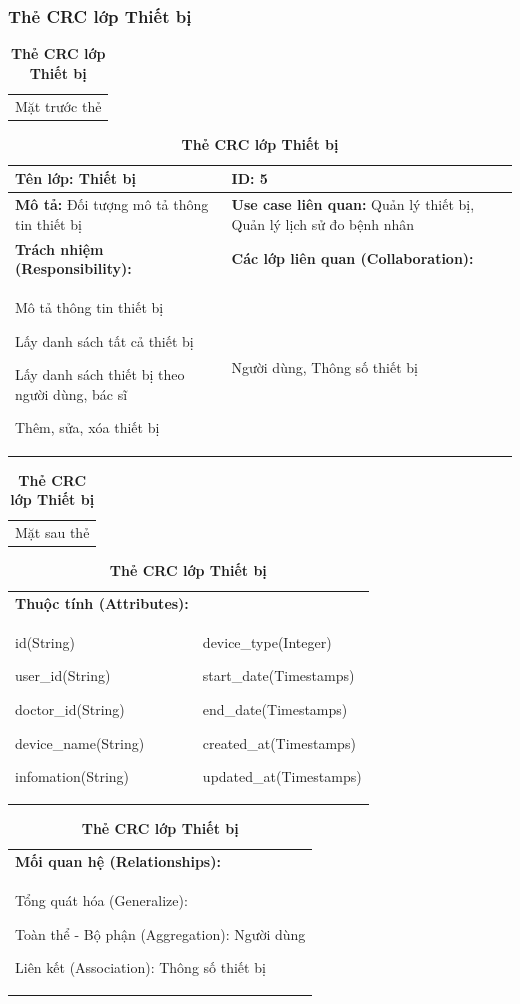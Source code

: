   \subsubsection{Thẻ CRC lớp Thiết bị}
  \begin{table}[H]
    \caption{\bfseries \fontsize{12pt}{0pt}\selectfont Thẻ CRC lớp Thiết bị}
    \centering
    \begin{tabularx}{0.9\textwidth}{X}
      Mặt trước thẻ
    \end{tabularx}
    \begin{tabularx}{0.9\textwidth}{|X|X|}
      \hline
      \textbf{Tên lớp:} Thiết bị & \textbf{ID:} 5 \\
      \hline
      \textbf{Mô tả:} Đối tượng mô tả thông tin thiết bị & \textbf{Use case liên quan:} Quản lý thiết bị, Quản lý lịch sử đo bệnh nhân \\
      \hline
      \textbf{Trách nhiệm (Responsibility):} & \textbf{Các lớp liên quan (Collaboration):} \\
      Mô tả thông tin thiết bị

      Lấy danh sách tất cả thiết bị

      Lấy danh sách thiết bị theo người dùng, bác sĩ
      
      Thêm, sửa, xóa thiết bị
      & 
      Người dùng, Thông số thiết bị 
      \\
      \hline
    \end{tabularx}
    \begin{tabularx}{0.9\textwidth}{X}
      Mặt sau thẻ
    \end{tabularx}
    \begin{tabularx}{0.9\textwidth}{|X|X|}
      \hline
      \textbf{Thuộc tính (Attributes):} & \\
      id(String) 
      
      user\_id(String)

      doctor\_id(String)

      device\_name(String)

      infomation(String)
      & 
      device\_type(Integer)

      start\_date(Timestamps) 
      
      end\_date(Timestamps) 
      
      created\_at(Timestamps)

      updated\_at(Timestamps)
      \\
      \hline
    \end{tabularx}
    \begin{tabularx}{0.9\textwidth}{|X|}
      \textbf{Mối quan hệ (Relationships):} \\
      Tổng quát hóa (Generalize):  

      Toàn thể - Bộ phận (Aggregation): Người dùng
      
      Liên kết (Association): Thông số thiết bị
      \\
      \hline
    \end{tabularx}
  \end{table}

